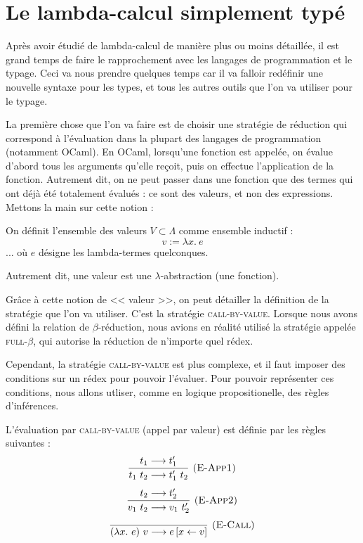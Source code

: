 \documentclass[11pt]{article}
\begin{document}
\section{Le lambda-calcul simplement typé}

Après avoir étudié de lambda-calcul de manière plus ou moins détaillée, il est grand temps de faire le rapprochement avec les langages de programmation et le typage. Ceci va nous prendre quelques temps car il va falloir redéfinir une nouvelle syntaxe pour les types, et tous les autres outils que l'on va utiliser pour le typage.

La première chose que l'on va faire est de choisir une stratégie de réduction qui correspond à l'évaluation dans la plupart des langages de programmation (notamment OCaml). En OCaml, lorsqu'une fonction est appelée, on évalue d'abord tous les arguments qu'elle reçoit, puis on effectue l'application de la fonction. Autrement dit, on ne peut passer dans une fonction que des termes qui ont déjà été totalement évalués : ce sont des valeurs, et non des expressions. Mettons la main sur cette notion :

\begin{definition}
    On définit l'ensemble des valeurs $V\subset \Lambda$ comme ensemble inductif :
    $$ v := \lambda x.~e$$
    ... où $e$ désigne les lambda-termes quelconques.

    Autrement dit, une valeur est une $\lambda$-abstraction (une fonction).
\end{definition}

Grâce à cette notion de << valeur >>, on peut détailler la définition de la stratégie que l'on va utiliser. C'est la stratégie {\scshape{call-by-value}}. Lorsque nous avons défini la relation de $\beta$-réduction, nous avions en réalité utilisé la stratégie appelée {\scshape{full}-$\beta$}, qui autorise la réduction de n'importe quel rédex.

Cependant, la stratégie {\scshape{call-by-value}} est plus complexe, et il faut imposer des conditions sur un rédex pour pouvoir l'évaluer. Pour pouvoir représenter ces conditions, nous allons utliser, comme en logique propositionelle, des règles d'inférences.

\begin{definition}
    L'évaluation par {\scshape{call-by-value}} (appel par valeur) est définie par les règles suivantes :
    $$\infer[(\text{\scshape{E-App1}})] {t_1~t_2 \longrightarrow t_1'~t_2}{t_1\longrightarrow t_1'}$$
    $$\infer[(\text{\scshape{E-App2}})] {v_1~t_2 \longrightarrow v_1~t_2'}{t_2\longrightarrow t_2'}$$
    $$\infer[(\text{\scshape{E-Call}})] {(\lambda x.~e)~v\longrightarrow e\left[x\leftarrow v\right]}{}$$
\end{definition}
\end{document}
